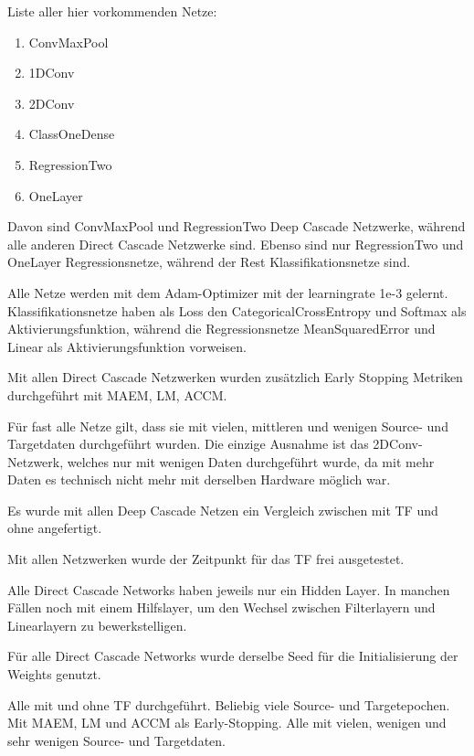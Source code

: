 
Liste aller hier vorkommenden Netze:

\begin{enumerate}
    \item ConvMaxPool
    \item 1DConv
    \item 2DConv
    \item ClassOneDense
    \item RegressionTwo
    \item OneLayer
\end{enumerate}

Davon sind ConvMaxPool und RegressionTwo Deep Cascade Netzwerke, während alle anderen Direct Cascade Netzwerke sind. 
Ebenso sind nur RegressionTwo und OneLayer Regressionsnetze, während der Rest Klassifikationsnetze sind. 

Alle Netze werden mit dem Adam-Optimizer mit der learningrate 1e-3 gelernt. Klassifikationsnetze haben als Loss den 
CategoricalCrossEntropy und Softmax als Aktivierungsfunktion, während die Regressionsnetze MeanSquaredError und Linear als 
Aktivierungsfunktion vorweisen. 

Mit allen Direct Cascade Netzwerken wurden zusätzlich Early Stopping Metriken durchgeführt mit MAEM, LM, ACCM. 

Für fast alle Netze gilt, dass sie mit vielen, mittleren und wenigen Source- und Targetdaten durchgeführt wurden. Die 
einzige Ausnahme ist das 2DConv-Netzwerk, welches nur mit wenigen Daten durchgeführt wurde, da mit mehr Daten es 
technisch nicht mehr mit derselben Hardware möglich war. 

Es wurde mit allen Deep Cascade Netzen ein Vergleich zwischen mit TF und ohne angefertigt. 

Mit allen Netzwerken wurde der Zeitpunkt für das TF frei ausgetestet. 

Alle Direct Cascade Networks haben jeweils nur ein Hidden Layer. In manchen Fällen noch mit einem Hilfslayer, um den Wechsel 
zwischen Filterlayern und Linearlayern zu bewerkstelligen. 

Für alle Direct Cascade Networks wurde derselbe Seed für die Initialisierung der Weights genutzt. 


\iffalse
Alle mit und ohne TF durchgeführt. Beliebig viele Source- und Targetepochen. Mit MAEM, LM und ACCM als Early-Stopping. 
Alle mit vielen, wenigen und sehr wenigen Source- und Targetdaten. 

